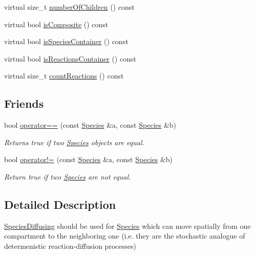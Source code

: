 \begin{DoxyCompactItemize}
\item 
virtual size\-\_\-t \hyperlink{classchem_1_1Component_a720ec4ef4aaadfec3e47c31451d28637}{number\-Of\-Children} () const 
\item 
virtual bool \hyperlink{classchem_1_1Component_af2c73f75f937d457a55c1e0120833cb8}{is\-Composite} () const 
\item 
virtual bool \hyperlink{classchem_1_1Component_a3c0f652fe5b6910f07c046fe0190b7b5}{is\-Species\-Container} () const 
\item 
virtual bool \hyperlink{classchem_1_1Component_a8c79ee4335fadfcef56b14a62b742457}{is\-Reactions\-Container} () const 
\item 
virtual size\-\_\-t \hyperlink{classchem_1_1Component_ab061b8b7d97db554af402ebb9723dc4c}{count\-Reactions} () const 
\end{DoxyCompactItemize}
\subsection*{Friends}
\begin{DoxyCompactItemize}
\item 
bool \hyperlink{classchem_1_1Species_a22987c5719b74c50465256ea5b9d80bf}{operator==} (const \hyperlink{classchem_1_1Species}{Species} \&a, const \hyperlink{classchem_1_1Species}{Species} \&b)
\begin{DoxyCompactList}\small\item\em Returns true if two \hyperlink{classchem_1_1Species}{Species} objects are equal. \end{DoxyCompactList}\item 
bool \hyperlink{classchem_1_1Species_aff630d716711fbbab3bc7f598230316b}{operator!=} (const \hyperlink{classchem_1_1Species}{Species} \&a, const \hyperlink{classchem_1_1Species}{Species} \&b)
\begin{DoxyCompactList}\small\item\em Return true if two \hyperlink{classchem_1_1Species}{Species} are not equal. \end{DoxyCompactList}\end{DoxyCompactItemize}


\subsection{Detailed Description}
\hyperlink{classchem_1_1SpeciesDiffusing}{Species\-Diffusing} should be used for \hyperlink{classchem_1_1Species}{Species} which can move spatially from one compartment to the neighboring one (i.\-e. they are the stochastic analogue of determenistic reaction-\/diffusion processes) 

